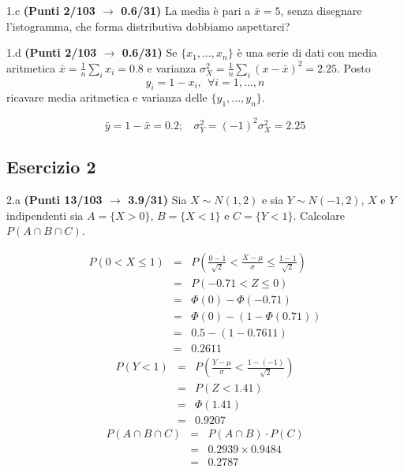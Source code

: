 \documentclass[
  11pt,
]{book}
\theoremstyle{mytheoremstyle}
\theoremstyle{mydefstyle}
\newenvironment{sol}
  {
  \begin{tcolorbox}[enhanced,breakable,arc=0.1mm,boxrule=1pt,colback=white,colframe=iblue,
  title=\bf \fontfamily{lmss}\selectfont \hspace{.5 cm} Soluzione,drop fuzzy shadow]

}{
\end{tcolorbox}
  }
\begin{document}
1.c \textbf{(Punti 2/103 \(\rightarrow\) 0.6/31)} La media è pari a \(\bar x=5\), senza disegnare l'istogramma, che forma distributiva dobbiamo aspettarci?

1.d \textbf{(Punti 2/103 \(\rightarrow\) 0.6/31)} Se \(\{x_1,...,x_n\}\) è una serie di dati con media aritmetica \(\bar x=\frac 1n\sum_i x_i=0.8\) e varianza \(\sigma_X^2=\frac 1n\sum_i(x-\bar x)^2=2.25\). Posto
\[
y_i = 1-x_i,~~\forall i=1,...,n
\]
ricavare media aritmetica e varianza delle \(\{y_1,...,y_n\}\).

\begin{sol}
\[
\bar y = 1-\bar x = 0.2 ;~~~~\sigma_Y^2=(-1)^2\sigma_X^2=2.25
\]

\end{sol}

\subsection{Esercizio 2}\label{esercizio-2-45}

2.a \textbf{(Punti 13/103 \(\rightarrow\) 3.9/31)} Sia \(X\sim N(1,2)\) e sia \(Y\sim N(-1,2)\), \(X\) e \(Y\) indipendenti sia \(A=\{X>0\}\), \(B=\{X<1\}\) e \(C=\{Y<1\}\).
Calcolare \(P(A\cap B\cap C)\).

\begin{sol}
\begin{eqnarray*}
   P( 0 < X \leq  1 ) &=& P\left( \frac { 0  -  1 }{\sqrt{ 2 }} < \frac { X  -  \mu }{ \sigma } \leq \frac { 1  -  1 }{\sqrt{ 2 }}\right)  \\
              &=& P\left(  -0.71  < Z \leq  0 \right) \\
              &=& \Phi( 0 )-\Phi( -0.71 )\\
              &=&  \Phi( 0 )-(1-\Phi( 0.71 )) \\ &=&  0.5 -(1- 0.7611 ) \\ 
              &=&  0.2611 
   \end{eqnarray*}
\begin{eqnarray*}
      P( Y   <   1 ) 
        &=& P\left(  \frac { Y  -  \mu }{ \sigma }  <  \frac { 1  -  ( -1 ) }{\sqrt{ 2 }} \right)  \\
                 &=& P\left(  Z   <   1.41 \right) \\    
                 &=&  \Phi( 1.41 ) \\ &=&  0.9207 
      \end{eqnarray*}\begin{eqnarray}
      P( A\cap B \cap C ) &=& P( A\cap B )\cdot P( C ) \\
                         &=&  0.2939 \times 0.9484  \\
                         &=&  0.2787 \end{eqnarray}

\end{sol}
\end{document}
